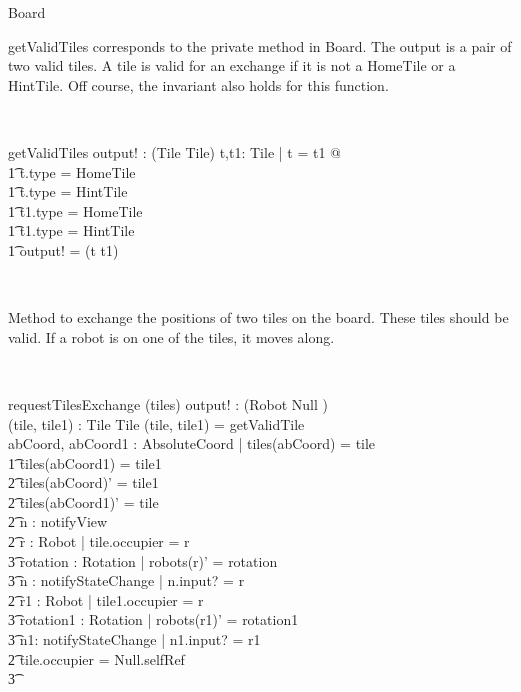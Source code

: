 \begin{class}{Board}
\znewpage
\begin{classcom}
getValidTiles corresponds to the private method in Board. The output is a pair of two valid tiles. A tile is valid for an exchange if it is not a HomeTile or a HintTile. Off course, the invariant also holds for this function.
\end{classcom} \\
\begin{schema}{getValidTiles}
output! : (Tile \cross Tile)
\where
\exists t,t1: Tile | t \not = t1  @ \\ \t1
t.type \not = HomeTile \\ \t1
t.type \not = HintTile \\ \t1
t1.type \not = HomeTile \\ \t1
t1.type \not = HintTile \implies \\ \t1
output! = (t \cross t1)
\end{schema} \\
\begin{classcom}
Method to exchange the positions of two tiles on the board. These tiles should be valid. If a robot is on one of the tiles, it moves along.
\end{classcom} \\
\begin{schema}{requestTilesExchange}
\Delta (tiles)
output! : ({Robot \union Null} ) \\
(tile, tile1) : Tile \cross Tile
\where
(tile, tile1)  = getValidTile \\
\exists abCoord, abCoord1 : AbsoluteCoord | tiles(abCoord) = tile \\ \t1
tiles(abCoord1) = tile1 \implies \\ \t2
tiles(abCoord)' = tile1 \\ \t2
tiles(abCoord1)' = tile \\ \t2
\exists n : notifyView \\ \t2
\exists r : Robot | tile.occupier = r \implies \\ \t3
\exists rotation : Rotation | robots(r)' = rotation \\ \t3
\exists n : notifyStateChange | n.input? = r \\ \t2
\exists r1 : Robot | tile1.occupier = r \implies \\ \t3
\exists rotation1 : Rotation | robots(r1)' = rotation1 \\ \t3
\exists n1: notifyStateChange | n1.input? = r1 \\ \t2
\IF tile.occupier = Null.selfRef \\ \t3

\end{schema}
\end{class}
